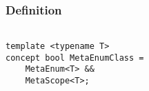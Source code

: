 
\subsubsection{Definition}

\begin{verbatim}

template <typename T>
concept bool MetaEnumClass =
	MetaEnum<T> &&
	MetaScope<T>;

\end{verbatim}
